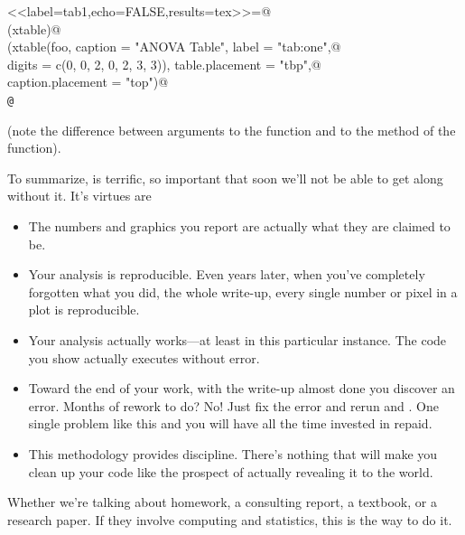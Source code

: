 \documentclass[12pt]{article}
\begin{document}
\begin{tabbing}
\verb@<<label=tab1,echo=FALSE,results=tex>>=@ \\
\verb@library(xtable)@ \\
\verb@print(xtable(foo, caption = "ANOVA Table", label = "tab:one",@ \\
\verb@    digits = c(0, 0, 2, 0, 2, 3, 3)), table.placement = "tbp",@ \\
\verb@    caption.placement = "top")@ \\
\verb+@+
\end{tabbing}
(note the difference between arguments to the \verb@xtable@ function
and to the \verb@xtable@ method of the \verb@print@ function).

To summarize, \verb@Sweave@ is terrific, so important that soon
we'll not be able to get along without it.  It's virtues are
\begin{itemize}
\item The numbers and graphics you report are actually what they
are claimed to be.
\item Your analysis is reproducible.  Even years later, when you've
completely forgotten what you did, the whole write-up, every single
number or pixel in a plot is reproducible.
\item Your analysis actually works---at least in this particular instance.
The code you show actually executes without error.
\item Toward the end of your work, with the write-up almost done you
discover an error.  Months of rework to do?  No!  Just fix the error
and rerun \verb@Sweave@ and \verb@latex@.  One single problem like
this and you will have all the time invested in \verb@Sweave@ repaid.
\item This methodology provides discipline.
There's nothing that will make you clean up your code like
the prospect of actually revealing it to the world.
\end{itemize}

Whether we're talking about homework, a consulting report, a textbook,
or a research paper.  If they involve computing and statistics,
this is the way to do it.
\end{document}
